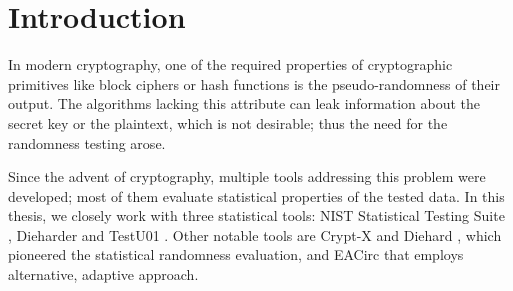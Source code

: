 \documentclass[
	digital,    %
	oneside,
	color,
	11pt,
	nocover,
	notable,
	nolof,
	nolot,
]{fithesis3}
\theoremstyle{definition}
\theoremstyle{remark}
\begin{document}

\makeatletter
\def\thesis@blocks@thanks{%
	\ifx\thesis@thanks\undefined\else
		\thesis@blocks@clear
		\begin{alwayssingle}%
			\chapter*{\thesis@@{thanksTitle}}%
			\leavevmode\thesis@thanks
		\end{alwayssingle}%
	\fi}
\def\thesis@blocks@abstract{%
	\begin{alwayssingle}%
	{\def\clearpage{}
		\chapter*{\thesis@@{abstractTitle}}}%
		\noindent\thesis@abstract
		\par\vfil\null
		\clearpage{}
	\end{alwayssingle}}
\def\thesis@blocks@keywords{%
	\begin{alwayssingle}%
	{\def\clearpage{}
		\chapter*{\thesis@@{keywordsTitle}}}%
		\noindent\thesis@keywords
		\par\vfil\null
		\clearpage{}
	\end{alwayssingle}}
\thesis@preamble
\makeatother

\chapter{Introduction}
In modern cryptography, one of the required properties of cryptographic primitives like block ciphers or hash functions is the pseudo-randomness of their output. The algorithms lacking this attribute can leak information about the secret key or the plaintext, which is not desirable; thus the need for the randomness testing arose.

Since the advent of cryptography, multiple tools addressing this problem were developed; most of them evaluate statistical properties of the tested data. In this thesis, we closely work with three statistical tools: NIST Statistical Testing Suite \cite{nist-sts}, Dieharder \cite{dieharder} and TestU01 \cite{testu01-paper}. Other notable tools are Crypt-X \cite{crypt-x} and Diehard \cite{diehard}, which pioneered the statistical randomness evaluation, and EACirc \cite{eacirc-github} that employs alternative, adaptive approach.
\end{document}
